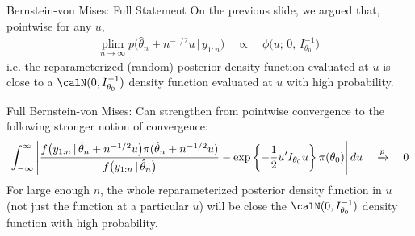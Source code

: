 \documentclass[aspectratio=169, handout]{beamer}
\newcommand{\ra}{\rightarrow}
\newcommand{\pto}{\xrightarrow{p}}
\begin{document}
{\scriptsize
\begin{frame}{Bernstein-von Mises: Full Statement}
On the previous slide, we argued that, pointwise for any $u$,
\begin{align*}
  \underset{n\ra\infty}{\text{plim}}
  \;
  p\big(\hat{\theta}_n+n^{-1/2}u\,|\,y_{1:n}\big)
  \quad
  \propto
  \quad
  \phi\big(u;\,0,\,I_{\theta_0}^{-1}\big)
\end{align*}
i.e. the reparameterized (random) posterior density function evaluated
at $u$ is close to a $\calN(0,I_{\theta_0}^{-1})$ density function
evaluated at $u$ with high probability.

\alert{Full Bernstein-von Mises}:
Can strengthen from pointwise convergence to the following stronger
notion of convergence:
\begin{align*}
  \int_{-\infty}^\infty
  \left\lvert
  \frac{%
    f\big(y_{1:n}\,|\,\hat{\theta}_n+n^{-1/2}u\big)
    \pi(\hat{\theta}_n+n^{-1/2}u)
  }{%
    f\big(y_{1:n}\,|\,\hat{\theta}_n\big)
  }
  -
  \exp\left\{
    -\frac{1}{2}u'I_{\theta_0}u
  \right\}
  \pi(\theta_0)
  \right\rvert
  du
  \quad
  \pto
  \quad
  0
\end{align*}
For large enough $n$, the \alert{whole} reparameterized
posterior density function in $u$ (not just the function at a particular
$u$) will be close the $\calN(0,I_{\theta_0}^{-1})$ density function
with high probability.
\end{frame}
}
\end{document}
